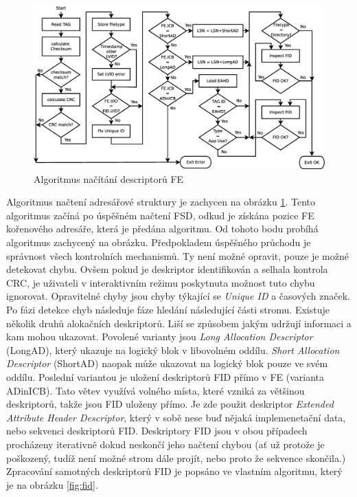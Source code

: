 \begin{figure}[] 
    \centering
    \includegraphics[scale=0.36]{obrazky/get-file.eps}
    \caption{Algoritmus načítání descriptorů FE}
    \label{fig:files}
\end{figure}Algoritmus načtení adresářové struktury je zachycen na obrázku \ref{fig:files}. Tento algoritmus začíná po úspěšném načtení FSD, odkud je získána pozice FE kořenového adresáře, která je předána algoritmu. Od tohoto bodu probíhá algoritmus zachycený na obrázku. Předpokladem úspěšného průchodu je správnost všech kontrolních mechanismů. Ty není možné opravit, pouze je možné detekovat chybu. Ovšem pokud je deskriptor identifikován a selhala kontrola CRC, je uživateli v interaktivním režimu poskytnuta možnost tuto chybu ignorovat. Opravitelné chyby jsou chyby týkající se \textit{Unique ID} a časových značek. Po fázi detekce chyb následuje fáze hledání následující části stromu. Existuje několik druhů alokačních deskriptorů. Liší se způsobem jakým udržují informaci a kam mohou ukazovat. Povolené varianty jsou \textit{Long Allocation Descriptor} (LongAD), který ukazuje na logický blok v libovolném oddílu. \textit{Short Allocation Descriptor} (ShortAD) naopak může ukazovat na logický blok pouze ve svém oddílu. Poslední variantou je uložení deskriptorů FID přímo v FE (varianta ADinICB). Tato větev využívá volného místa, které vzniká za většinou deskriptorů, takže jsou FID uloženy přímo. Je zde použit deskriptor \textit{Extended Attribute Header Descriptor}, který v sobě nese buď nějaká implemenetační data, nebo sekvenci deskriptorů FID. Deskriptory FID jsou v obou případech procházeny iterativně dokud neskončí jeho načtení chybou (ať už protože je poškozený, tudíž není možné strom dále projít, nebo proto že sekvence skončila.) Zpracování samotných deskriptorů FID je popsáno ve vlastním algoritmu, který je na obrázku \ref{fig:fid}.

